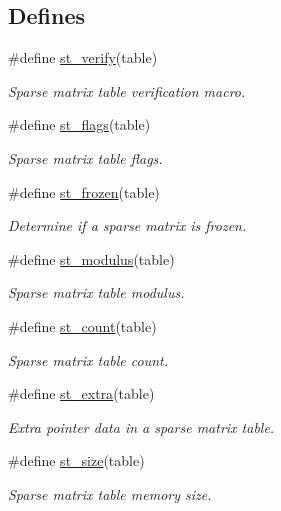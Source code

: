 \subsection*{Defines}
\begin{CompactItemize}
\item 
\#define \hyperlink{group__dbprim__smat_a21}{st\_\-verify}(table)
\begin{CompactList}\small\item\em Sparse matrix table verification macro. \item\end{CompactList}\item 
\#define \hyperlink{group__dbprim__smat_a22}{st\_\-flags}(table)
\begin{CompactList}\small\item\em Sparse matrix table flags. \item\end{CompactList}\item 
\#define \hyperlink{group__dbprim__smat_a23}{st\_\-frozen}(table)
\begin{CompactList}\small\item\em Determine if a sparse matrix is frozen. \item\end{CompactList}\item 
\#define \hyperlink{group__dbprim__smat_a24}{st\_\-modulus}(table)
\begin{CompactList}\small\item\em Sparse matrix table modulus. \item\end{CompactList}\item 
\#define \hyperlink{group__dbprim__smat_a25}{st\_\-count}(table)
\begin{CompactList}\small\item\em Sparse matrix table count. \item\end{CompactList}\item 
\#define \hyperlink{group__dbprim__smat_a26}{st\_\-extra}(table)
\begin{CompactList}\small\item\em Extra pointer data in a sparse matrix table. \item\end{CompactList}\item 
\#define \hyperlink{group__dbprim__smat_a27}{st\_\-size}(table)
\begin{CompactList}\small\item\em Sparse matrix table memory size. \item\end{CompactList}\item 

\end{CompactItemize}
